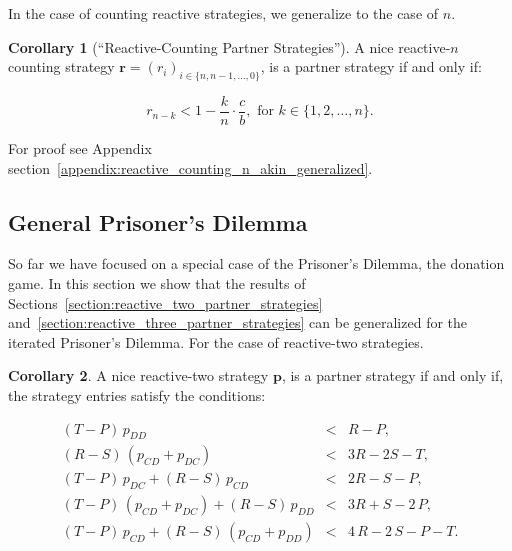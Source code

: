 \documentclass{article}
\theoremstyle{definition}
\newtheorem{corollary}{Corollary}[theorem]
\begin{document}
In the case of counting reactive strategies, we generalize to the case of $n$.

\begin{corollary}[``Reactive-Counting Partner Strategies'']\label{corollary:reactive_counting_partner_strategies}
A nice reactive-$n$ counting strategy $\mathbf{r}=(r_i)_{i \in \{n, n-1, \dots, 0\}}$,
is a partner strategy if and only if:

\begin{equation}
  r_{n - k} < 1 - \frac{k}{n} \cdot \frac{c}{b}, \text{ for } k \in \{1, 2, \dots, n\}.
\end{equation}

For proof see Appendix section~\ref{appendix:reactive_counting_n_akin_generalized}.

\end{corollary}


\subsection{General Prisoner's Dilemma}

So far we have focused on a special case of the Prisoner's Dilemma, the donation
game. In this section we show that the results of Sections~\ref{section:reactive_two_partner_strategies}
and~\ref{section:reactive_three_partner_strategies} can be generalized
for the iterated Prisoner's Dilemma. For the case of reactive-two strategies.

\begin{corollary}\label{corollary:reactive_two_partner_strategies_PD}
A nice reactive-two strategy $\mathbf{p}$, is a partner strategy if and only if,
the strategy entries satisfy the conditions:

\begin{equation*}
  \begin{array}{ccc}
    (T - P)\, p_{DD} & < & R - P, \\ [0.2cm]
    (R - S)\, (p_{CD} + p_{DC}) & < & 3 R - 2 S - T, \\ [0.2cm]
    (T - P)\, p_{DC}  + (R - S)\, p_{CD} & < & 2 R - S - P, \\ [0.2cm]
    (T - P)\, (p_{CD} + p_{DC}) + (R - S)\, p_{DD}  & < & 3 R + S - 2\,P, \\ [0.2cm]
    (T - P)\, p_{CD}  + (R - S)\, (p_{CD} + p_{DD}) & < & 4\,R - 2\,S - P - T.
\end{array}
\end{equation*}
\end{corollary}
\end{document}
